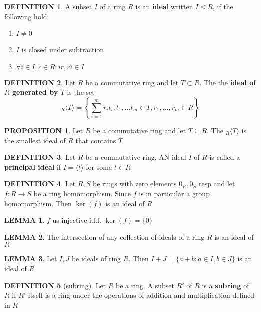 \documentclass[10pt]{article}
\theoremstyle{definition}
\newtheorem{definition}{DEFINITION}[subsection]
\newtheorem{lemma}{LEMMA}[subsection]
\newtheorem{prop}{PROPOSITION}[subsection]
\begin{document}
\begin{definition}
    A subset $I$ of a ring $R$ is an \textbf{ideal},written $I \trianglelefteq R$, if the following hold:
    \begin{enumerate}
        \item $I \neq 0$
        \item $I$ is closed under subtraction
        \item $\forall i \in I, r\in R: ir,ri\in I$
    \end{enumerate} 
\end{definition}

\begin{definition}
    Let $R$ be a commutative ring and let $T \subset R$. The the \textbf{ideal of $R$ generated by $T$} is the set
    $$_R\langle T\rangle = \left\{\sum_{i=1}^m{r_it_i}: t_1,...t_m\in T, r_1,...,r_m \in R\right\}$$
\end{definition}

\begin{prop}
    Let $R$ be a commutative ring and let $T \subseteq R$. The $_R\langle T \rangle$ is the smallest ideal of $R$ that contains $T$
\end{prop}

\begin{definition}
    Let $R$ be a commutative ring. AN ideal $I$ of $R$ is called a \textbf{principal ideal} if $I = \langle t \rangle$ for some $t \in R$
\end{definition}

\begin{definition}
    Let $R,S$ be rings with zero elements $0_R,0_S$ resp and let $f:R\rightarrow S$ be a ring homomorphism. Since $f$ is in particular a group homomorphism. Then $\ker(f)$ is an ideal of $R$
\end{definition}

\begin{lemma}
    $f$ us injective i.f.f. $\ker(f) = \{0\}$
\end{lemma}

\begin{lemma}
    The intersection of any collection of ideals of a ring $R$ is an ideal of $R$
\end{lemma}

\begin{lemma}
    Let $I,J$ be ideals of ring $R$. Then $I+J = \{a+b:a\in I, b\in J\}$ is an ideal of $R$
\end{lemma}

\begin{definition}[subring]
    Let $R$ be a ring. A subset $R'$ of $R$ is a \textbf{subring} of $R$ if $R'$ itself is a ring under the operations of addition and multiplication defined in $R$
\end{definition}
\end{document}
